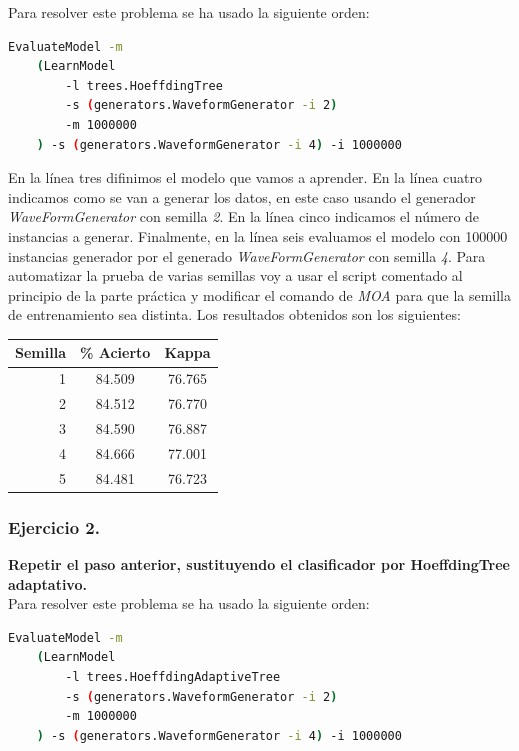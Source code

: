 \documentclass[11pt]{article}
\begin{document}
Para resolver este problema se ha usado la siguiente orden:

\begin{lstlisting}[language=bash]
EvaluateModel -m
	(LearnModel 
		-l trees.HoeffdingTree 
		-s (generators.WaveformGenerator -i 2) 
		-m 1000000
	) -s (generators.WaveformGenerator -i 4) -i 1000000
\end{lstlisting}

En la línea tres difinimos el modelo que vamos a aprender. En la línea cuatro indicamos como se van a generar los datos, en este caso usando el generador \textit{WaveFormGenerator} con semilla \textit{2}. En la línea cinco indicamos el número de instancias a generar. Finalmente, en la línea seis evaluamos el modelo con 100000 instancias generador por el generado \textit{WaveFormGenerator} con semilla \textit{4}. Para automatizar la prueba de varias semillas voy a usar el script comentado al principio de la parte práctica y modificar el comando de \textit{MOA} para que la semilla de entrenamiento sea distinta. Los resultados obtenidos son los siguientes:

\begin{table}[H]
	\centering
	\begin{tabular}{rcc}
		\textbf{Semilla} & \textbf{\% Acierto} & \textbf{Kappa} \\ \hline
		1 & 84.509 & 76.765 \\
		2 & 84.512 & 76.770 \\
		3 & 84.590 & 76.887 \\
		4 & 84.666 & 77.001 \\
		5 & 84.481 & 76.723
	\end{tabular}
\end{table}

\subsubsection{Ejercicio 2.}

\textbf{Repetir el paso anterior, sustituyendo el clasificador por HoeffdingTree adaptativo.} \\

Para resolver este problema se ha usado la siguiente orden:

\begin{lstlisting}[language=bash]
EvaluateModel -m
	(LearnModel 
		-l trees.HoeffdingAdaptiveTree 
		-s (generators.WaveformGenerator -i 2) 
		-m 1000000
	) -s (generators.WaveformGenerator -i 4) -i 1000000
\end{lstlisting}
\end{document}
